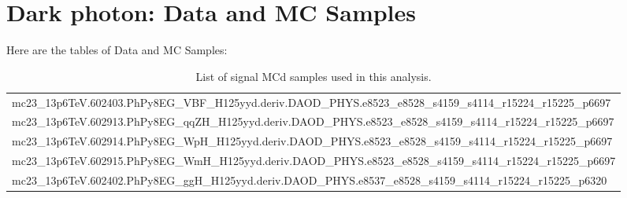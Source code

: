 \appendix
\renewcommand\thefigure{\thechapter.\arabic{figure}}
\renewcommand\thetable{\thechapter.\arabic{table}}

\chapter{Dark photon: Data and MC Samples}
\label{ch:chapter}
Here are the tables of Data and MC Samples:
\begin{table}[ht]
\centering
\scriptsize
\caption{List of signal MCd samples used in this analysis.}
\label{tab:signal-samples}
\begin{tabular}{l}
\toprule
mc23\_13p6TeV.602403.PhPy8EG\_VBF\_H125yyd.deriv.DAOD\_PHYS.e8523\_e8528\_s4159\_s4114\_r15224\_r15225\_p6697\\
mc23\_13p6TeV.602913.PhPy8EG\_qqZH\_H125yyd.deriv.DAOD\_PHYS.e8523\_e8528\_s4159\_s4114\_r15224\_r15225\_p6697\\
mc23\_13p6TeV.602914.PhPy8EG\_WpH\_H125yyd.deriv.DAOD\_PHYS.e8523\_e8528\_s4159\_s4114\_r15224\_r15225\_p6697\\
mc23\_13p6TeV.602915.PhPy8EG\_WmH\_H125yyd.deriv.DAOD\_PHYS.e8523\_e8528\_s4159\_s4114\_r15224\_r15225\_p6697\\
mc23\_13p6TeV.602402.PhPy8EG\_ggH\_H125yyd.deriv.DAOD\_PHYS.e8537\_e8528\_s4159\_s4114\_r15224\_r15225\_p6320\\
\bottomrule
\end{tabular}
\end{table}

